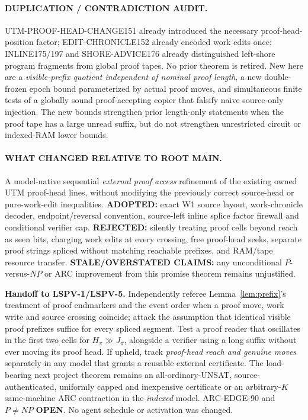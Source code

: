 \documentclass[11pt]{article}
\begin{document}
\paragraph{DUPLICATION / CONTRADICTION AUDIT.} UTM-PROOF-HEAD-CHANGE151 already introduced the necessary proof-head-position factor; EDIT-CHRONICLE152 already encoded work edits once; INLINE175/197 and SHORE-ADVICE176 already distinguished left-shore program fragments from global proof tapes. No prior theorem is retired. New here are a \emph{visible-prefix quotient independent of nominal proof length}, a new double-frozen epoch bound parameterized by actual proof moves, and simultaneous finite tests of a globally sound proof-accepting copier that falsify naive source-only injection. The new bounds strengthen prior length-only statements when the proof tape has a large unread suffix, but do not strengthen unrestricted circuit or indexed-RAM lower bounds.

\paragraph{WHAT CHANGED RELATIVE TO ROOT MAIN.} A model-native sequential \emph{external proof access} refinement of the existing owned UTM proof-head lines, without modifying the previously correct source-head or pure-work-edit inequalities. \textbf{ADOPTED:} exact W1 source layout, work-chronicle decoder, endpoint/reversal convention, source-left inline splice factor firewall and conditional verifier cap. \textbf{REJECTED:} silently treating proof cells beyond reach as seen bits, charging work edits at every crossing, free proof-head seeks, separate proof strings spliced without matching reachable prefixes, and RAM/tape resource transfer. \textbf{STALE/OVERSTATED CLAIMS:} any unconditional $P$-versus-$NP$ or ARC improvement from this promise theorem remains unjustified.

\noindent\textbf{Handoff to LSPV-1/LSPV-5.} Independently referee Lemma~\ref{lem:prefix}'s treatment of proof endmarkers and the event order when a proof move, work write and source crossing coincide; attack the assumption that identical visible proof prefixes suffice for every spliced segment. Test a proof reader that oscillates in the first two cells for $H_\pi\gg J_\pi$, alongside a verifier using a long suffix without ever moving its proof head. If upheld, track \emph{proof-head reach and genuine moves} separately in any model that grants a reusable external certificate. The load-bearing next project theorem remains an all-ordinary-UNSAT, source-authenticated, uniformly capped and inexpensive certificate or an arbitrary-$K$ same-machine ARC contraction in the \emph{indexed} model. ARC-EDGE-90 and $P\ne NP$ \textbf{OPEN}. No agent schedule or activation was changed.
\end{document}
